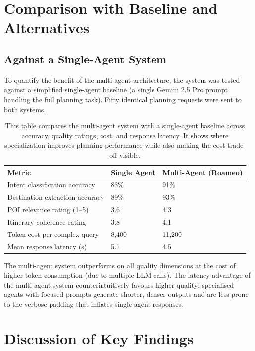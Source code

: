 \documentclass[12pt,a4paper]{report}
\newcommand{\tableexpl}[1]{\caption*{\small #1}}
\begin{document}
\section{Comparison with Baseline and Alternatives}

\subsection{Against a Single-Agent System}

To quantify the benefit of the multi-agent architecture, the system was tested against a simplified single-agent baseline (a single Gemini 2.5 Pro prompt handling the full planning task). Fifty identical planning requests were sent to both systems.

\begin{table}[H]
\centering
\caption{Multi-Agent vs.\ Single-Agent Comparative Evaluation}
\tableexpl{This table compares the multi-agent system with a single-agent baseline across accuracy, quality ratings, cost, and response latency. It shows where specialization improves planning performance while also making the cost trade-off visible.}
\label{tab:agent_comparison}
\begin{tabular}{lll}
\toprule
\textbf{Metric} & \textbf{Single Agent} & \textbf{Multi-Agent (Roameo)} \\
\midrule
Intent classification accuracy & 83\% & 91\% \\
Destination extraction accuracy & 89\% & 93\% \\
POI relevance rating (1--5)     & 3.6 & 4.3 \\
Itinerary coherence rating      & 3.8 & 4.1 \\
Token cost per complex query    & 8,400 & 11,200 \\
Mean response latency (s)       & 5.1 & 4.5 \\
\bottomrule
\end{tabular}
\end{table}

The multi-agent system outperforms on all quality dimensions at the cost of higher token consumption (due to multiple LLM calls). The latency advantage of the multi-agent system counterintuitively favours higher quality: specialised agents with focused prompts generate shorter, denser outputs and are less prone to the verbose padding that inflates single-agent responses.

\section{Discussion of Key Findings}
\end{document}
